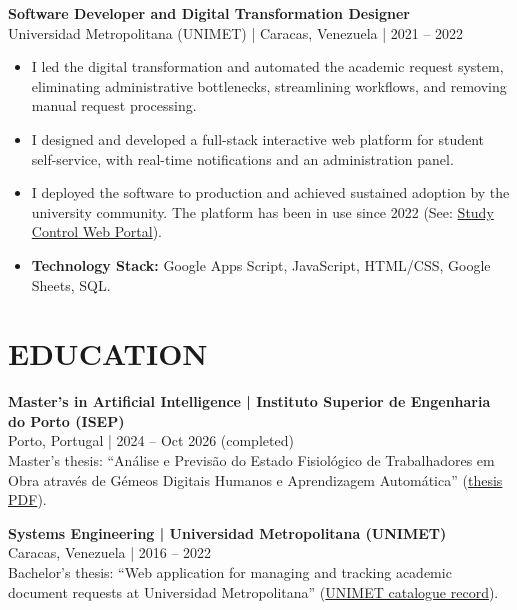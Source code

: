 \documentclass[10pt,a4paper]{article}
\begin{document}
\par\addvspace{\baselineskip}
\textbf{\large Software Developer and Digital Transformation Designer}\\
Universidad Metropolitana (UNIMET) | Caracas, Venezuela | 2021 -- 2022
\begin{itemize}
    \item I led the digital transformation and automated the academic request system, eliminating administrative bottlenecks, streamlining workflows, and removing manual request processing.
    \item I designed and developed a full-stack interactive web platform for student self-service, with real-time notifications and an administration panel.
    \item I deployed the software to production and achieved sustained adoption by the university community. The platform has been in use since 2022 (See: \href{https://script.google.com/macros/s/AKfycbw3h26r_mjt0jow79RT9dnPaUKZ81dVUsF8qDeEjp7wsRg-ldqHjlB9L0FJYP_Uc_LXUw/exec}{Study Control Web Portal}).
    \item \textbf{Technology Stack:} Google Apps Script, JavaScript, HTML/CSS, Google Sheets, SQL.
\end{itemize}

\section*{EDUCATION}

\textbf{Master's in Artificial Intelligence | Instituto Superior de Engenharia do Porto (ISEP)}\\
Porto, Portugal | 2024 -- Oct 2026 (completed)\\
Master's thesis: ``Análise e Previsão do Estado Fisiológico de Trabalhadores em Obra através de Gémeos Digitais Humanos e Aprendizagem Automática'' (\href{https://drive.google.com/file/d/1xlqiDRtNX2Xj5_9TnHy6inUlAnseSHbF/view?usp=drive\_link}{thesis PDF}).

\textbf{Systems Engineering | Universidad Metropolitana (UNIMET)}\\
Caracas, Venezuela | 2016 -- 2022\\
Bachelor's thesis: ``Web application for managing and tracking academic document requests at Universidad Metropolitana'' (\href{https://unimet.ent.sirsi.net/client/es_ES/default/search/detailnonmodal/ent:\%24002f\%24002fSD\_ILS\%24002f0\%24002fSD\_ILS:132264/one}{UNIMET catalogue record}).
\end{document}
